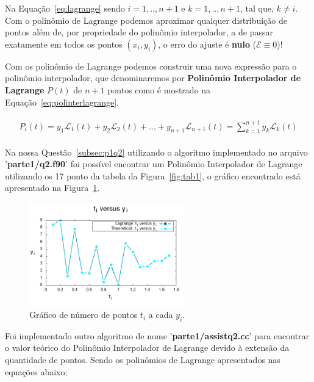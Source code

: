 \documentclass[12pt]{article}
\begin{document}
Na Equação~\ref{eq:lagrange} sendo $i = 1,..,n+1$ e $k = 1, .., n+1$, tal que, $k \neq i$. Com o polinômio de Lagrange podemos aproximar qualquer distribuição de pontos além de, por propriedade do polinômio interpolador, a de passar exatamente em todos os pontos $(x_{i}, y_{i})$, o erro do ajuste é \textbf{nulo} ($\mathcal{E}\equiv 0$)! 

Com os polinômio de Lagrange podemos construir uma nova expressão para o polinômio interpolador, que denominaremos por \textbf{Polinômio Interpolador de Lagrange} $P(t)$ de $n+1$ pontos como é mostrado na Equação~\ref{eq:polinterlagrange}.

\begin{eqnarray}
\begin{split}
P_{i}(t) = y_{1}\mathcal{L}_{1}(t) + y_{2}\mathcal{L}_{2}(t) + ... + y_{n+1}\mathcal{L}_{n+1}(t) = \sum^{n+1}_{k=1} y_{k}\mathcal{L}_{k}(t)
\end{split}
\label{eq:polinterlagrange}
\end{eqnarray}

Na nossa Questão~\ref{subsec:p1q2} utilizando o algoritmo implementado no arquivo '\textbf{parte1/q2.f90}' foi possível encontrar um Polinômio Interpolador de Lagrange utilizando os 17 ponto da tabela da Figura~\ref{fig:tab1}, o gráfico encontrado está apresentado na Figura~\ref{fig:p1q2}.

\begin{figure}[H]
	\centering
	\includegraphics[width=0.6\textwidth]{p1q2g1.png}
	\caption{Gráfico de número de pontos $t_{i}$ a cada $y_{i}$.}
	\label{fig:p1q2}
\end{figure}

Foi implementado outro algoritmo de nome '\textbf{parte1/assistq2.cc}' para encontrar o valor teórico do Polinômio Interpolador de Lagrange devido à extensão da quantidade de pontos. Sendo os polinômios de Lagrange apresentados nas equações abaixo:
\end{document}
